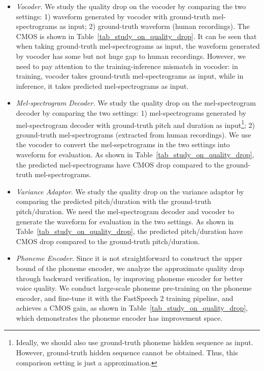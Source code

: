 \documentclass{article}
\theoremstyle{definition}
\begin{document}
\begin{itemize}[leftmargin=*]

\item \textit{Vocoder.} We study the quality drop on the vocoder by comparing the two settings: 1) waveform generated by vocoder with ground-truth mel-spectrograms as input; 2) ground-truth waveform (human recordings). The CMOS is shown in Table~\ref{tab_study_on_quality_drop}. It can be seen that when taking ground-truth mel-spectrograms as input, the waveform generated by vocoder has some but not huge gap to human recordings. However, we need to pay attention to the training-inference mismatch in vocoder: in training, vocoder takes ground-truth mel-spectrograms as input, while in inference, it takes predicted mel-spectrograms as input. 

\item \textit{Mel-spectrogram Decoder.} We study the quality drop on the mel-spectrogram decoder by comparing the two settings: 1) mel-spectrograms generated by mel-spectrogram decoder with ground-truth pitch and duration as input\footnote{Ideally, we should also use ground-truth phoneme hidden sequence as input. However, ground-truth hidden sequence cannot be obtained. Thus, this comparison setting is just a approximation.}; 2) ground-truth mel-spectrograms (extracted from human recordings). We use the vocoder to convert the mel-sepctrograms in the two settings into waveform for evaluation. As shown in Table~\ref{tab_study_on_quality_drop}, the predicted mel-spectrograms have  CMOS drop compared to the ground-truth mel-spectrograms.

\item \textit{Variance Adaptor.} We study the quality drop on the variance adaptor by comparing the predicted pitch/duration with the ground-truth pitch/duration. We need the mel-spectrogram decoder and vocoder to generate the waveform for evaluation in the two settings. As shown in Table~\ref{tab_study_on_quality_drop}, the predicted pitch/duration have  CMOS drop compared to the ground-truth pitch/duration. 

\item \textit{Phoneme Encoder.} Since it is not straightforward to construct the upper bound of the phoneme encoder, we analyze the approximate quality drop through backward verification, by improving phoneme encoder for better voice quality. We conduct large-scale phoneme pre-training on the phoneme encoder, and fine-tune it with the FastSpeech 2 training pipeline, and achieves a  CMOS gain, as shown in Table~\ref{tab_study_on_quality_drop}, which demonstrates the phoneme encoder has improvement space.

\end{itemize}
\end{document}
